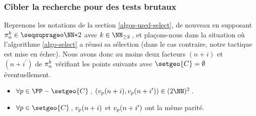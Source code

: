 \subsubsection{Cibler la recherche pour des tests brutaux} \label{algos-used-kill}

\leavevmode
\smallskip

Reprenons les notations de la section \ref{algos-used-select}, de nouveau en supposant $\consprod \in \NNssquare$ avec $k \in \NN_{\geq 2}$\,, et plaçons-nous dans la situation où l'algorithme \ref{algo-select} a réussi sa sélection (dans le cas contraire, notre tactique est mise en échec).
Nous avons donc au moins deux facteurs $(n+i)$ et $(n+i^\prime)$ de $\consprod$ vérifiant les points suivants avec $\setgeo{C} = \emptyset$ éventuellement.
%
\begin{itemize}
	\item $\forall p \in \PP - \setgeo{C}$\,, $( \padicval{n+i}, \padicval{n+i^\prime} ) \in ( 2 \NN )^2$\,.

	\item $\forall p \in \setgeo{C}$\,, $\padicval{n+i}$ et $\padicval{n+i^\prime}$ ont la même parité.
\end{itemize}

